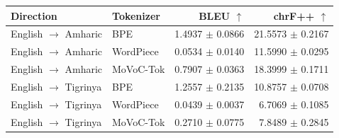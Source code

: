 \begin{tabular}{llrr}
\toprule
Direction & Tokenizer & BLEU $\uparrow$ & chrF++ $\uparrow$ \\
\midrule
English $\rightarrow$ Amharic & BPE & 1.4937 $\pm$ 0.0866 & 21.5573 $\pm$ 0.2167 \\
English $\rightarrow$ Amharic & WordPiece & 0.0534 $\pm$ 0.0140 & 11.5990 $\pm$ 0.0295 \\
English $\rightarrow$ Amharic & MoVoC-Tok & 0.7907 $\pm$ 0.0363 & 18.3999 $\pm$ 0.1711 \\
English $\rightarrow$ Tigrinya & BPE & 1.2557 $\pm$ 0.2135 & 10.8757 $\pm$ 0.0708 \\
English $\rightarrow$ Tigrinya & WordPiece & 0.0439 $\pm$ 0.0037 & 6.7069 $\pm$ 0.1085 \\
English $\rightarrow$ Tigrinya & MoVoC-Tok & 0.2710 $\pm$ 0.0775 & 7.8489 $\pm$ 0.2845 \\
\bottomrule
\end{tabular}
